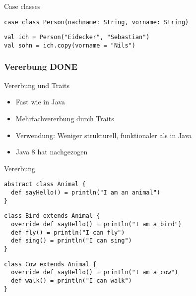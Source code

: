 \documentclass[14pt,aspectratio=169,trans]{beamer} %
\begin{document}
\begin{frame}[fragile]{}
 \begin{block}{Case classes}
\scriptsize
	\onslide<2->
  \begin{lstlisting}
case class Person(nachname: String, vorname: String)

	\end{lstlisting}
  \begin{lstlisting}[firstnumber=5]
val ich = Person("Eidecker", "Sebastian")
val sohn = ich.copy(vorname = "Nils")
	\end{lstlisting}
\end{block}
\end{frame}


\subsubsection*{Vererbung DONE}

\begin{frame}[fragile]{}
 \begin{block}{Vererbung und Traits}
\begin{itemize}
	\item<2->Fast wie in Java
	\item<3->Mehrfachvererbung durch Traits
	\item<4->Verwendung: Weniger strukturell, funktionaler als in Java
	\item<5->Java 8 hat nachgezogen
\end{itemize}
\end{block}
\end{frame}


\begin{frame}[fragile]{}
	\begin{block}{Vererbung}
		\scriptsize
		\onslide<2->
  \begin{lstlisting}
abstract class Animal {
  def sayHello() = println("I am an animal")
}
	\end{lstlisting}
{
\begin{lstlisting}[firstnumber=4]
class Bird extends Animal {
  override def sayHello() = println("I am a bird")
  def fly() = println("I can fly")
  def sing() = println("I can sing")
}
\end{lstlisting}
}
{
\begin{lstlisting}[firstnumber=9]
class Cow extends Animal {
  override def sayHello() = println("I am a cow")
  def walk() = println("I can walk")
}
\end{lstlisting}
}
	\end{block}
	\note{}
\end{frame}
\end{document}
